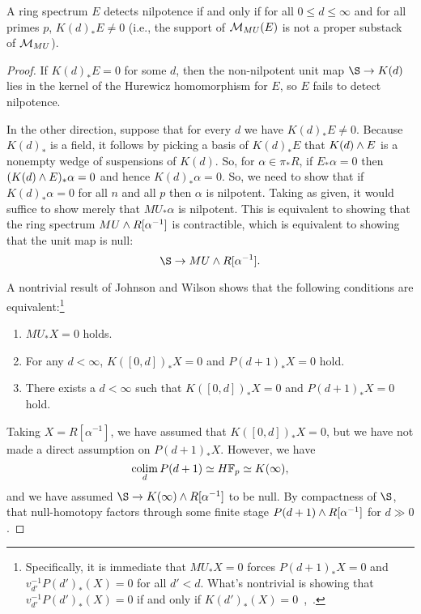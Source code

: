 \begin{corollary}\label{LocalNilpotenceDetection}
A ring spectrum \(E\) detects nilpotence if and only if for all \(0 \le d \le \infty\) and for all primes \(p\), \(K(d)_* E \ne 0\) (i.e., the support of \(\mathcal{M}_{MU}(E)\) is not a proper substack of \(\mathcal{M}_{MU}\)).
\end{corollary}
\begin{proof}
If \(K(d)_* E = 0\) for some \(d\), then the non-nilpotent unit map \(\S \to K(d)\) lies in the kernel of the Hurewicz homomorphism for \(E\), so \(E\) fails to detect nilpotence.

In the other direction, suppose that for every \(d\) we have \(K(d)_* E \ne 0\).  Because \(K(d)_*\) is a field, it follows by picking a basis of \(K(d)_* E\) that \(K(d) \wedge E\) is a nonempty wedge of suspensions of \(K(d)\).  So, for \(\alpha \in \pi_* R\), if \(E_* \alpha = 0\) then \((K(d) \wedge E)_* \alpha = 0\) and hence \(K(d)_* \alpha = 0\).  So, we need to show that if \(K(d)_* \alpha = 0\) for all \(n\) and all \(p\) then \(\alpha\) is nilpotent.  Taking  as given, it would suffice to show merely that \(MU_* \alpha\) is nilpotent.  This is equivalent to showing that the ring spectrum \(MU \wedge R[\alpha^{-1}]\) is contractible, which is equivalent to showing that the unit map is null: \[\S \to MU \sm R[\alpha^{-1}].\]

A nontrivial result of Johnson and Wilson shows that the following conditions are equivalent:\footnote{Specifically, it is immediate that \(MU_* X = 0\) forces \(P(d+1)_* X = 0\) and \(v_{d'}^{-1} P(d')_*(X) = 0\) for all \(d' < d\).  What's nontrivial is showing that \(v_{d'}^{-1} P(d')_*(X) = 0\) if and only if \(K(d')_*(X) = 0\)~\cite[Theorem 2.1.a]{RavenelLocalizationWRTPeriodic},~\cite[Section 3]{JohnsonWilson}.}
\begin{enumerate}
    \item \(MU_* X = 0\) holds.
    \item For any \(d < \infty\), \(K([0, d])_* X = 0\) and \(P(d+1)_* X = 0\) hold.
    \item There exists a \(d < \infty\) such that \(K([0, d])_* X = 0\) and \(P(d+1)_* X = 0\) hold.
\end{enumerate}
Taking \(X = R[\alpha^{-1}]\), we have assumed that \(K([0, d])_* X = 0\), but we have not made a direct assumption on \(P(d+1)_* X\).  However, we have \[\colim_d P(d+1) \simeq \HFp \simeq K(\infty),\] and we have assumed \(\S \to K(\infty) \sm R[\alpha^{-1}]\) to be null.  By compactness of \(\S\), that null-homotopy factors through some finite stage \(P(d+1) \wedge R[\alpha^{-1}]\) for \(d \gg 0\).
\end{proof}

